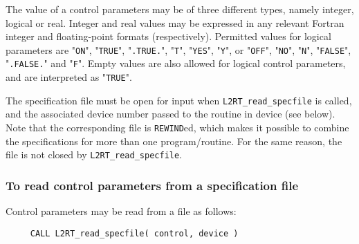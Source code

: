 \documentclass{galahad}
\newcommand{\packagename}{L2\-RT}
\begin{document}
The value of a control parameters may be of three different types, namely
integer, logical or real.
Integer and real values may be expressed in any relevant Fortran integer and
floating-point formats (respectively). Permitted values for logical
parameters are "{\tt ON}", "{\tt TRUE}", "{\tt .TRUE.}", "{\tt T}", 
"{\tt YES}", "{\tt Y}", or "{\tt OFF}", "{\tt NO}",
"{\tt N}", "{\tt FALSE}", "{\tt .FALSE.}" and "{\tt F}". 
Empty values are also allowed for 
logical control parameters, and are interpreted as "{\tt TRUE}".  

The specification file must be open for 
input when {\tt \packagename\_read\_specfile}
is called, and the associated device number 
passed to the routine in device (see below). 
Note that the corresponding 
file is {\tt REWIND}ed, which makes it possible to combine the specifications 
for more than one program/routine.  For the same reason, the file is not
closed by {\tt \packagename\_read\_specfile}.

\subsubsection{To read control parameters from a specification file}
\label{readspec}

Control parameters may be read from a file as follows:
\hskip0.5in 
\def\baselinestretch{0.8} {\tt \begin{verbatim}
     CALL L2RT_read_specfile( control, device )
\end{verbatim}}
\def\baselinestretch{1.0}
\end{document}
